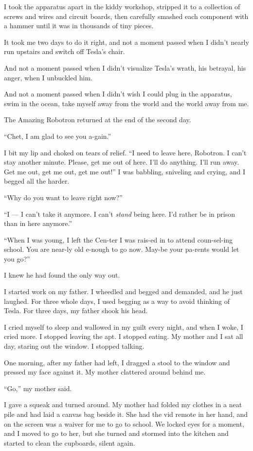 \tb

I took the apparatus apart in the kiddy workshop, stripped it to a
collection of screws and wires and circuit boards, then carefully
smashed each component with a hammer until it was in thousands of
tiny pieces.

It took me two days to do it right, and not a moment passed when I
didn't nearly run upstairs and switch off Tesla's chair.

And not a moment passed when I didn't visualize Tesla's wrath, his
betrayal, his anger, when I unbuckled him.

And not a moment passed when I didn't wish I could plug in the
apparatus, swim in the ocean, take myself away from the world and
the world away from me.

The Amazing Robotron returned at the end of the second day.

``Chet, I am glad to see you a-gain.''

I bit my lip and choked on tears of relief.
``I need to leave here, Robotron. I can't stay another minute. Please, get me 
out of here. I'll do anything. I'll run away. Get me out, get me out, get me 
out!''
I was babbling, sniveling and crying, and I begged all the harder.

``Why do you want to leave right now?''

``I --- I can't take it anymore. I can't \emph{stand} being here. I'd rather be 
in prison than in here anymore.''

``When I was young, I left the Cen-ter I was rais-ed in to attend coun-sel-ing 
school. You are near-ly old e-nough to go now. May-be your pa-rents would let 
you go?''

I knew he had found the only way out.

I started work on my father. I wheedled and begged and demanded,
and he just laughed. For three whole days, I used begging as a way
to avoid thinking of Tesla. For three days, my father shook his
head.

I cried myself to sleep and wallowed in my guilt every night, and
when I woke, I cried more. I stopped leaving the apt. I stopped
eating. My mother and I sat all day, staring out the window. I
stopped talking.

One morning, after my father had left, I dragged a stool to the
window and pressed my face against it. My mother clattered around
behind me.

``Go,'' my mother said.

I gave a squeak and turned around. My mother had folded my clothes
in a neat pile and had laid a canvas bag beside it. She had the vid
remote in her hand, and on the screen was a waiver for me to go to
school. We locked eyes for a moment, and I moved to go to her, but
she turned and stormed into the kitchen and started to clean the
cupboards, silent again.

